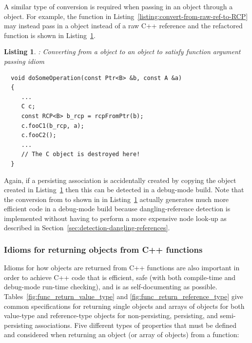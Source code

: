 \documentclass[pdf,ps2pdf,11pt]{SANDreport}
\newtheorem{listing}{Listing}
\begin{document}
A similar type of conversion is required when passing in an object
through a {} object.  For example, the function in
Listing~\ref{listing:convert-from-raw-ref-to-RCP} may instead pass in
a {} object instead of a raw C++ reference {} and
the refactored function is shown in
Listing~\ref{listing:convert-from-Ptr-to-RCP}.


{}\begin{listing}: Converting from a {} object to an
{} object to satisfy function argument passing idiom
\label{listing:convert-from-Ptr-to-RCP}
{\small\begin{verbatim}
  void doSomeOperation(const Ptr<B> &b, const A &a)
  {
     ...
     C c;
     const RCP<B> b_rcp = rcpFromPtr(b);
     c.fooC1(b_rcp, a);
     c.fooC2();
     ...
     // The C object is destroyed here!
  }
\end{verbatim}}
\end{listing}


Again, if a persisting association is accidentally created by copying
the {} object created in
Listing~\ref{listing:convert-from-Ptr-to-RCP} then this can be
detected in a debug-mode build.  Note that the conversion from
{} to {} shown in in
Listing~\ref{listing:convert-from-Ptr-to-RCP} actually generates much
more efficient code in a debug-mode build because dangling-reference
detection is implemented without having to perform a more expensive
node look-up as described in
Section~\ref{sec:detection-dangling-references}.


%
{}\subsubsection{Idioms for returning objects from C++ functions}
\label{sec:idioms-returning-objects}
%

Idioms for how objects are returned from C++ functions are also
important in order to achieve C++ code that is efficient, safe (with
both compile-time and debug-mode run-time checking), and is as
self-documenting as possible.  Tables~\ref{fig:func_return_value_type}
and {}\ref{fig:func_return_reference_type} give common specifications
for returning single objects and arrays of objects for both value-type
and reference-type objects for non-persisting, persisting, and
semi-persisting associations.  Five different types of properties that
must be defined and considered when returning an object (or array of
objects) from a function:
\end{document}
